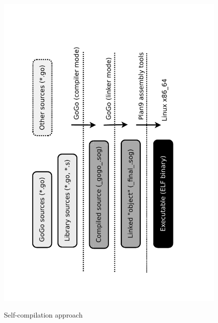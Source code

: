 \documentclass[a4paper]{scrartcl}
\begin{document}
      \begin{figure}
        \centering
        \includegraphics[scale=0.4,angle=-90,clip=true,trim=0cm 0cm 3cm 0cm]{files/building}
        \label{fig:sc}
        \caption{Self-compilation approach}
      \end{figure}  
\end{document}
